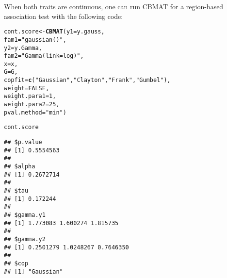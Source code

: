 \documentclass{article}\usepackage[]{graphicx}\usepackage[]{color}
\makeatletter
\newcommand{\hlnum}[1]{\textcolor[rgb]{0.686,0.059,0.569}{#1}}%
\newcommand{\hlstr}[1]{\textcolor[rgb]{0.192,0.494,0.8}{#1}}%
\newcommand{\hlstd}[1]{\textcolor[rgb]{0.345,0.345,0.345}{#1}}%
\newcommand{\hlkwb}[1]{\textcolor[rgb]{0.69,0.353,0.396}{#1}}%
\newcommand{\hlkwc}[1]{\textcolor[rgb]{0.333,0.667,0.333}{#1}}%
\newcommand{\hlkwd}[1]{\textcolor[rgb]{0.737,0.353,0.396}{\textbf{#1}}}%
\newenvironment{kframe}{%
 \def\at@end@of@kframe{}%
 \ifinner\ifhmode%
  \def\at@end@of@kframe{\end{minipage}}%
  \begin{minipage}{\columnwidth}%
 \fi\fi%
 \def\FrameCommand##1{\hskip\@totalleftmargin \hskip-\fboxsep
 \colorbox{shadecolor}{##1}\hskip-\fboxsep
     \hskip-\linewidth \hskip-\@totalleftmargin \hskip\columnwidth}%
 \MakeFramed {\advance\hsize-\width
   \@totalleftmargin\z@ \linewidth\hsize
   \@setminipage}}%
 {\par\unskip\endMakeFramed%
 \at@end@of@kframe}
\newenvironment{knitrout}{}{} %
\makeatother
\begin{document}
When both traits are continuous, one can run CBMAT for a region-based association test with the following code:
\begin{knitrout}
\color{fgcolor}\begin{kframe}
\begin{alltt}
\hlstd{cont.score} \hlkwb{<-} \hlkwd{CBMAT}\hlstd{(}\hlkwc{y1}\hlstd{=y.gauss,}
                    \hlkwc{fam1}\hlstd{=}\hlstr{"gaussian()"}\hlstd{,}
                    \hlkwc{y2}\hlstd{=y.Gamma,}
                    \hlkwc{fam2}\hlstd{=}\hlstr{"Gamma(link=log)"}\hlstd{,}
                    \hlkwc{x}\hlstd{=x,}
                    \hlkwc{G}\hlstd{=G,}
                    \hlkwc{copfit}\hlstd{=}\hlkwd{c}\hlstd{(}\hlstr{"Gaussian"}\hlstd{,}\hlstr{"Clayton"}\hlstd{,}\hlstr{"Frank"}\hlstd{,}\hlstr{"Gumbel"}\hlstd{),}
                    \hlkwc{weight}\hlstd{=}\hlnum{FALSE}\hlstd{,}
                    \hlkwc{weight.para1}\hlstd{=}\hlnum{1}\hlstd{,}
                    \hlkwc{weight.para2}\hlstd{=}\hlnum{25}\hlstd{,}
                    \hlkwc{pval.method}\hlstd{=}\hlstr{"min"}\hlstd{)}
\end{alltt}


{\ttfamily\noindent\itshape\color{messagecolor}{\#\# Starting association analysis...}}\begin{alltt}
\hlstd{cont.score}
\end{alltt}
\begin{verbatim}
## $p.value
## [1] 0.5554563
## 
## $alpha
## [1] 0.2672714
## 
## $tau
## [1] 0.172244
## 
## $gamma.y1
## [1] 1.773083 1.600274 1.815735
## 
## $gamma.y2
## [1] 0.2501279 1.0248267 0.7646350
## 
## $cop
## [1] "Gaussian"
\end{verbatim}
\end{kframe}
\end{knitrout}
\end{document}
